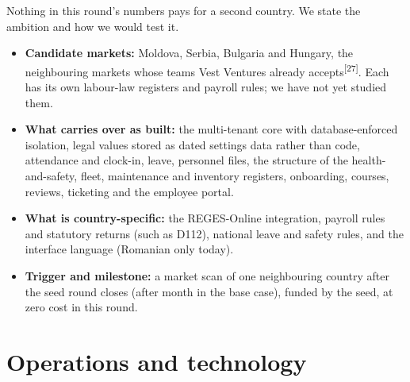 \documentclass[10pt,a4paper]{article}
\newcommand{\src}[1]{\textsuperscript{\textcolor{brandSlate}{[#1]}}}
\begin{document}
Nothing in this round's numbers pays for a second country. We state the ambition and how we would
test it.
\begin{itemize}
\item \textbf{Candidate markets:} Moldova, Serbia, Bulgaria and Hungary, the neighbouring markets
  whose teams Vest Ventures already accepts\src{27}. Each has its own labour-law registers and
  payroll rules; we have not yet studied them.
\item \textbf{What carries over as built:} the multi-tenant core with database-enforced isolation,
  legal values stored as dated settings data rather than code, attendance and clock-in, leave,
  personnel files, the structure of the health-and-safety, fleet, maintenance and inventory
  registers, onboarding, courses, reviews, ticketing and the employee portal.
\item \textbf{What is country-specific:} the REGES-Online integration, payroll rules and statutory
  returns (such as D112), national leave and safety rules, and the interface language (Romanian
  only today).
\item \textbf{Trigger and milestone:} a market scan of one neighbouring country after the seed round
  closes (after month  in the base case), funded by the seed, at zero cost in
  this round.
\end{itemize}

\section{Operations and technology}\label{sec:operatiuni}\nobreak
\end{document}
